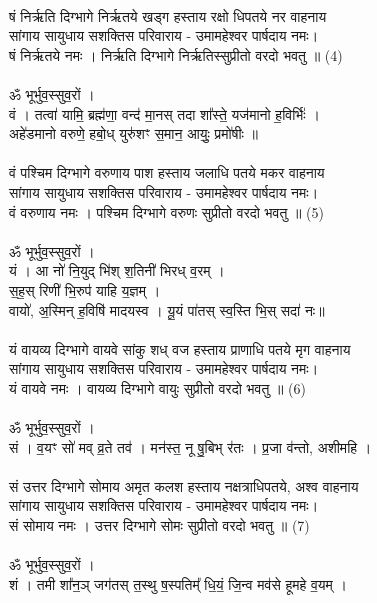 \\
षं निर्ऋति दिग्भागे निर्ऋतये खड्ग हस्ताय रक्षो धिपतये नर वाहनाय\\
सांगाय सायुधाय सशक्तिस परिवाराय -  उमामहेश्वर पार्षदाय नमः।\\
षं निर्ऋतये नमः । निर्ऋति दिग्भागे निर्ऋतिस्सुप्रीतो वरदो भवतु ॥ (4)\\
\\
ॐ भूर्भुव॒स्सुव॒रों ।\\
वं । तत्वा॑ यामि॒ ब्रह्म॑णा॒ वन्द॑ मा॒नस् तदा शा᳚स्ते॒ यज॑मानो ह॒विर्भिः॑ ।\\
अहे॑डमानो वरुणे॒ हबो॒ध् युरु॑शꣳ स॒मान॒ आयुः॒ प्रमो॑षीः ॥\\
\\
वं पश्चिम दिग्भागे वरुणाय पाश हस्ताय जलाधि पतये मकर वाहनाय\\
सांगाय सायुधाय सशक्तिस परिवाराय -  उमामहेश्वर पार्षदाय नमः।\\
वं वरुणाय नमः । पश्चिम दिग्भागे वरुणः सुप्रीतो वरदो भवतु ॥ (5)\\
\\
ॐ भूर्भुव॒स्सुव॒रों ।\\
यं । आ नो॑ नि॒युद् भि॑श् श॒तिनी॑ भिरध् व॒रम् । \\
स॒ह॒स् रिणी॑ भि॒रुप॑ याहि य॒ज्ञम् ।\\
वायो॑, अ॒स्मिन् ह॒विषि॑ मादयस्व । यू॒यं पा॑तस् स्व॒स्ति भि॒स् सदा॑ नः॥\\
\\
यं वायव्य दिग्भागे वायवे सांकु शध् वज हस्ताय प्राणाधि पतये मृग वाहनाय\\
सांगाय सायुधाय सशक्तिस परिवाराय -  उमामहेश्वर पार्षदाय नमः।\\
यं वायवे नमः । वायव्य दिग्भागे  वायुः सुप्रीतो  वरदो भवतु ॥ (6)\\
\\
ॐ भूर्भुव॒स्सुव॒रों ।\\
सं । व॒यꣳ सो॑ मव् व्र॒ते तव॑ । मन॑स्त॒ नू षु॒बिभ् र॑तः । प्र॒जा व॑न्तो, अशीमहि ।\\
\\
सं उत्तर दिग्भागे सोमाय अमृत कलश हस्ताय नक्षत्राधिपतये, अश्व वाहनाय\\
सांगाय सायुधाय सशक्तिस परिवाराय -  उमामहेश्वर पार्षदाय नमः।\\
सं सोमाय नमः । उत्तर दिग्भागे  सोमः सुप्रीतो वरदो भवतु ॥ (7)\\
\\
ॐ भूर्भुव॒स्सुव॒रों ।\\
शं । तमी शा᳚न॒ञ् जग॑तस् त॒स्थु ष॒स्पतिम्᳚ धि॒यं॒ जि॒न्व मव॑से हूमहे व॒यम् ।\\
